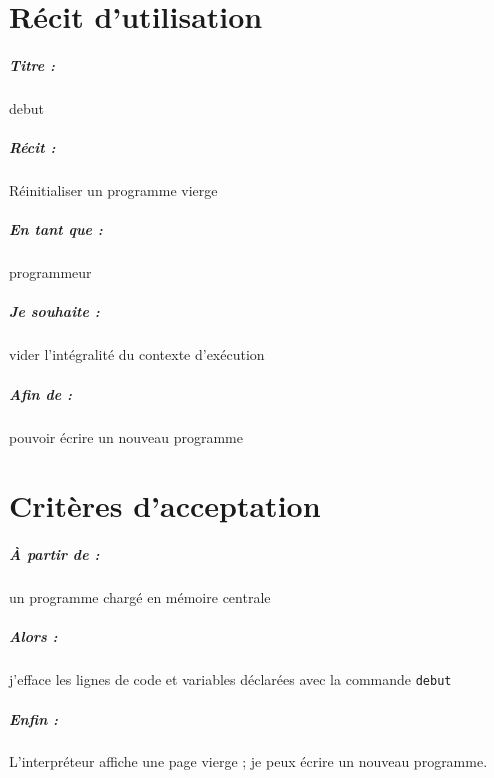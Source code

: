 \documentclass[12pt,a5paper, notitle, oneside]{report}
\begin{document}
    \chapter*{Récit d'utilisation}

    \paragraph{Titre : } debut
    \paragraph{Récit : } Réinitialiser un programme vierge
    \paragraph{En tant que : } programmeur
    \paragraph{Je souhaite : } vider l'intégralité du contexte d'exécution
    \paragraph{Afin de : } pouvoir écrire un nouveau programme
    \newpage

    \chapter*{Critères d'acceptation}

    \paragraph{À partir de : } un programme chargé en mémoire centrale
    \paragraph{Alors : } j'efface les lignes de code et variables déclarées
                         avec la commande \verb|debut|
    \paragraph{Enfin : } L'interpréteur affiche une page vierge ; je peux écrire un nouveau
                         programme.
\end{document}
